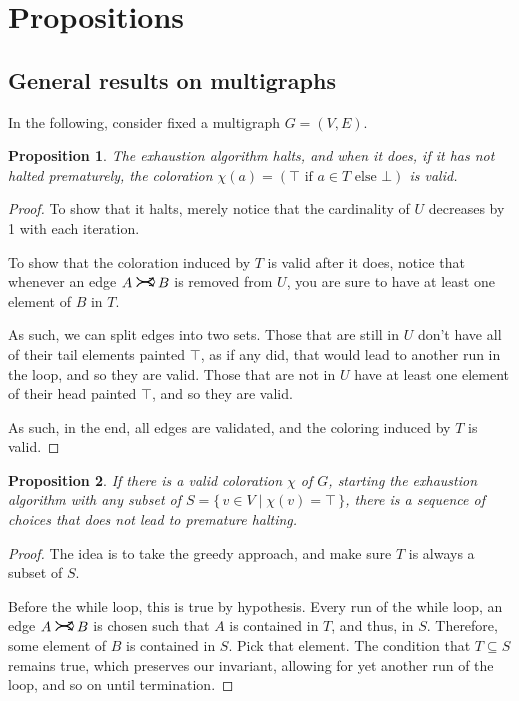 \documentclass[11pt]{article}
\newcommand{\rightcurvearrow}{
\mathrel{
  \begin{tikzpicture}[scale=0.8]
    \draw[thick,->] (0,1ex) arc (30:150:-2ex);
    \draw[thick,->] (0,-1ex) arc (150:30:2ex);
  \end{tikzpicture}
}
}
\newtheorem{prop}{Proposition}
\begin{document}
\section{Propositions}

\subsection{General results on multigraphs}

In the following, consider fixed a multigraph $G = (V,E)$.

\begin{prop}
The exhaustion algorithm halts, and when it does, if it has not halted prematurely, the coloration $\chi(a) = (\top \text{ if } a \in T \text{ else } \bot)$ is valid.
\end{prop}

\begin{proof}
To show that it halts, merely notice that the cardinality of $U$ decreases by 1 with each iteration.

To show that the coloration induced by $T$ is valid after it does, notice that whenever an edge $A \rightcurvearrow B$ is removed from $U$, you are sure to have at least one element of $B$ in $T$.

As such, we can split edges into two sets. Those that are still in $U$ don't have all of their tail elements painted $\top$, as if any did, that would lead to another run in the loop, and so they are valid. Those that are not in $U$ have at least one element of their head painted $\top$, and so they are valid.

As such, in the end, all edges are validated, and the coloring induced by $T$ is valid.
\end{proof}

\begin{prop}
If there is a valid coloration $\chi$ of $G$, starting the exhaustion algorithm with any subset of $S = \{ \, v \in V \mid \chi(v) = \top \, \}$, there is a sequence of choices that does not lead to premature halting.
\end{prop}

\begin{proof}
The idea is to take the greedy approach, and make sure $T$ is always a subset of  $S$.

Before the while loop, this is true by hypothesis. Every run of the while loop, an edge $A \rightcurvearrow B$ is chosen such that $A$ is contained in $T$, and thus, in $S$. Therefore, some element of $B$ is contained in $S$. Pick that element. The condition that $T \subseteq S$ remains true, which preserves our invariant, allowing for yet another run of the loop, and so on until termination.
\end{proof}
\end{document}
